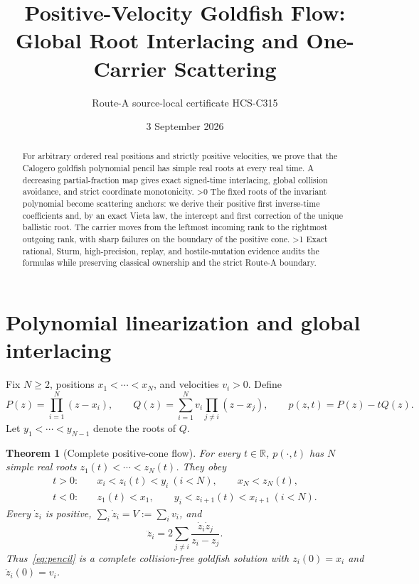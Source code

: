 \documentclass[10pt]{article}
\title{Positive-Velocity Goldfish Flow:\\
Global Root Interlacing and One-Carrier Scattering}
\author{Route-A source-local certificate HCS-C315}
\date{3 September 2026}
\providecommand{\CRevisionRound}{2}
\newtheorem{theorem}{Theorem}
\begin{document}
\maketitle
\begin{abstract}
For arbitrary ordered real positions and strictly positive velocities, we
prove that the Calogero goldfish polynomial pencil has simple real roots at
every real time.  A decreasing partial-fraction map gives exact signed-time
interlacing, global collision avoidance, and strict coordinate monotonicity.
\ifnum\CRevisionRound>0
The fixed roots of the invariant polynomial become scattering anchors: we
derive their positive first inverse-time coefficients and, by an exact
Vieta law, the intercept and first correction of the unique ballistic root.
The carrier moves from the leftmost incoming rank to the rightmost outgoing
rank, with sharp failures on the boundary of the positive cone.
\fi
\ifnum\CRevisionRound>1
Exact rational, Sturm, high-precision, replay, and hostile-mutation evidence
audits the formulas while preserving classical ownership and the strict
Route-A boundary.
\fi
\end{abstract}

\section{Polynomial linearization and global interlacing}
Fix $N\geq2$, positions $x_1<\cdots<x_N$, and velocities $v_i>0$.  Define
\begin{equation}\label{eq:pencil}
 P(z)=\prod_{i=1}^N(z-x_i),\qquad
 Q(z)=\sum_{i=1}^Nv_i\prod_{j\ne i}(z-x_j),\qquad
 p(z,t)=P(z)-tQ(z).
\end{equation}
Let $y_1<\cdots<y_{N-1}$ denote the roots of $Q$.

\begin{theorem}[Complete positive-cone flow]\label{thm:global}
For every $t\in\mathbb R$, $p(\cdot,t)$ has $N$ simple real roots
$z_1(t)<\cdots<z_N(t)$.  They obey
\begin{align}
 t>0:&\quad x_i<z_i(t)<y_i\ (i<N),\qquad x_N<z_N(t),\label{eq:pos}\\
 t<0:&\quad z_1(t)<x_1,\qquad y_i<z_{i+1}(t)<x_{i+1}\ (i<N).
 \label{eq:neg}
\end{align}
Every $\dot z_i$ is positive, $\sum_i\dot z_i=V:=\sum_i v_i$, and
\begin{equation}\label{eq:goldfish}
 \ddot z_i=2\sum_{j\ne i}\frac{\dot z_i\dot z_j}{z_i-z_j}.
\end{equation}
Thus~\eqref{eq:pencil} is a complete collision-free goldfish solution with
$z_i(0)=x_i$ and $\dot z_i(0)=v_i$.
\end{theorem}
\end{document}
